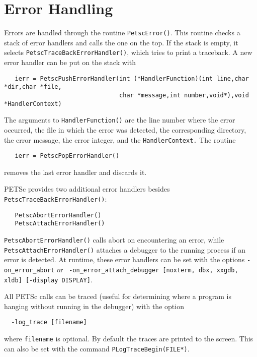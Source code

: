 \section{Error Handling}   

Errors are handled through the routine {\tt PetscError()}. 
 This routine
checks a stack of error handlers and calls the one on the top.  
If the stack is empty, it selects {\tt PetscTraceBackErrorHandler()}, 
which  tries to print a traceback. 
A new error handler can be put on the stack with
\begin{verbatim}
   ierr = PetscPushErrorHandler(int (*HandlerFunction)(int line,char *dir,char *file,
                                char *message,int number,void*),void *HandlerContext)
\end{verbatim}
The arguments to {\tt HandlerFunction()} are the line number where 
the error occurred, the file in which the error was detected, the corresponding
directory, the error message, the error integer, and the {\tt HandlerContext.}
The routine 
\begin{verbatim} 
   ierr = PetscPopErrorHandler()
\end{verbatim}
removes the last error handler and discards it. 

PETSc provides two additional error handlers besides 
{\tt PetscTraceBackErrorHandler()}:
 
\begin{verbatim}
   PetscAbortErrorHandler()
   PetscAttachErrorHandler()
\end{verbatim}
{\tt PetscAbortErrorHandler()} calls abort on encountering an error, while
{\tt PetscAttachErrorHandler()} attaches a debugger to the running process
if an error is detected. At runtime, these error handlers can be set
with the options {\tt -on\_error\_abort} or {\tt
-on\_error\_attach\_debugger [noxterm, dbx, xxgdb, xldb] [-display DISPLAY]}.

All PETSc calls can be traced (useful for determining where a program is 
hanging without running in the debugger) with the option
\begin{verbatim}
  -log_trace [filename]
\end{verbatim}
where {\tt filename} is optional. By default the traces are printed to the 
screen.  This can also be set with the 
command {\tt PLogTraceBegin(FILE*)}.  


